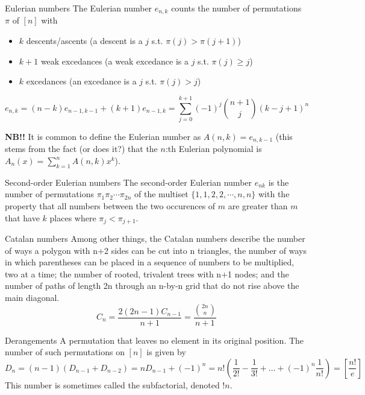 \begin{algorithm}{Eulerian numbers}
\desc
The Eulerian number $e_{n,k}$ counts the number of permutations $\pi$
of $[n]$ with
\begin{itemize}
\item $k$ descents/ascents (a descent is a $j$ s.t. $\pi(j) > \pi(j+1)$)
\item $k+1$ weak excedances (a weak excedance is a $j$ s.t. $\pi(j) \ge j$)
\item $k$ excedances (an excedance is a $j$ s.t. $\pi(j) > j$)
\end{itemize}
$$e_{n,k} = (n-k)e_{n-1,k-1} + (k+1) e_{n-1, k} = \sum_{j=0}^{k+1}
(-1)^j \binom{n+1}{j} (k - j + 1)^n$$

{\bf NB!!} It is common to define the Eulerian number as $A(n,k) =
e_{n,k-1}$ (this stems from the fact (or does it?) that the $n$:th
Eulerian polynomial is $A_n(x) = \sum_{k=1}^{n} A(n,k)x^k$).
\end{algorithm}

\begin{algorithm}{Second-order Eulerian numbers}
\desc
The second-order Eulerian number $e_{nk}$ is the number of
permutations $\pi_1 \pi_2 \cdots \pi_{2n}$ of the multiset
$\{1,1,2,2,\cdots,n,n\}$ with the property that all numbers between
the two occurences of $m$ are greater than $m$ that have $k$ places
where $\pi_j < \pi_{j+1}$.
\end{algorithm}

\begin{algorithm}{Catalan numbers}
\keyword{}
\desc
Among other things, the Catalan numbers describe the number of ways a polygon
with n+2 sides can be cut into n triangles, the number of ways in which
parentheses can be placed in a sequence of numbers to be multiplied, two at
a time; the number of rooted, trivalent trees with n+1 nodes; and the number
of paths of length 2n through an n-by-n grid that do not rise above the
main diagonal.
$$C_n = \frac{2(2n-1)C_{n-1}}{n+1} = \frac{\binom{2n}{n}}{\scriptstyle n+1}$$
\end{algorithm}

\begin{algorithm}{Derangements}
\keyword{}
\desc
A permutation that leaves no element in its original position.  The
number of such permutations on $[n]$ is given by
$$D_n = (n-1)(D_{n-1}+D_{n-2}) = nD_{n-1} + (-1)^n = n!\left(\frac
1{2!}-\frac 1{3!}+\ldots+(-1)^n\frac 1{n!}\right) =
\left[\frac{n!}{e}\right]$$
This number is sometimes called the subfactorial, denoted $!n$.
\end{algorithm}

